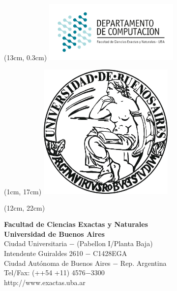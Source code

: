 \documentclass{article}
\begin{document}
\begin{textblock*}{16cm} (13cm, 0.3cm)
    \includegraphics[width=0.5\textwidth]{dc_logo.png}
\end{textblock*}

\begin{textblock*}{17cm} (1cm, 17cm)
    {
    \includegraphics[width=0.5\textwidth]{uba_logo.jpg}
    }
\end{textblock*}

\begin{textblock*}{40cm} (12cm, 22cm)
    {\raggedright\textbf{Facultad de Ciencias Exactas y Naturales}\\
    \textbf{Universidad de Buenos Aires}\\
    Ciudad Universitaria $-$ (Pabellon I/Planta Baja)\\
    Intendente Guiraldes 2610 $-$ C1428EGA\\
    Ciudad Autónoma de Buenos Aires $-$ Rep. Argentina\\
    Tel/Fax: (++54 +11) 4576$-$3300\\
    http://www.exactas.uba.ar
    }
\end{textblock*}
\end{document}
